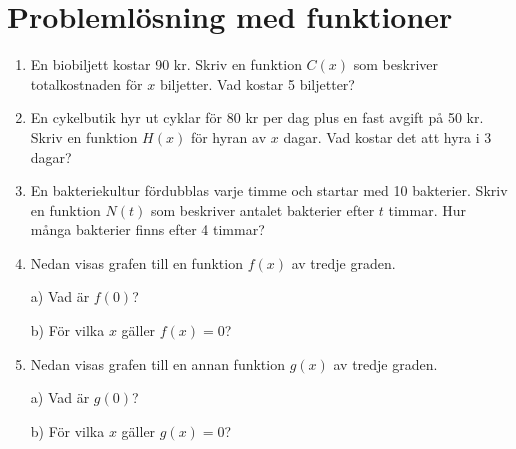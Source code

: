 \documentclass[a4paper,11pt]{article}
\begin{document}
\section{Problemlösning med funktioner}
\begin{enumerate}[label=\textbf{\arabic*.}]
    \item En biobiljett kostar 90 kr. Skriv en funktion $C(x)$ som beskriver totalkostnaden för $x$ biljetter. Vad kostar 5 biljetter?
    \item En cykelbutik hyr ut cyklar för 80 kr per dag plus en fast avgift på 50 kr. Skriv en funktion $H(x)$ för hyran av $x$ dagar. Vad kostar det att hyra i 3 dagar?
    \item En bakteriekultur fördubblas varje timme och startar med 10 bakterier. Skriv en funktion $N(t)$ som beskriver antalet bakterier efter $t$ timmar. Hur många bakterier finns efter 4 timmar?
    \item Nedan visas grafen till en funktion $f(x)$ av tredje graden.
    \begin{center}
    \end{center}
    a) Vad är $f(0)$?
    
    b) För vilka $x$ gäller $f(x) = 0$?

    \item Nedan visas grafen till en annan funktion $g(x)$ av tredje graden.
    \begin{center}
    \end{center}
    a) Vad är $g(0)$?
    
    b) För vilka $x$ gäller $g(x) = 0$?

\end{enumerate}
\end{document}
